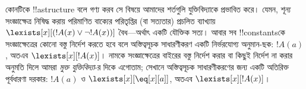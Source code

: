 \documentclass[../../../include/open-logic-section]{subfiles}
\begin{document}
\begin{digress}
কোনটিকে !!a{structure} বলে গণ্য করব সে বিষয়ে আমাদের শর্তগুলি
যুক্তিবিদ্যাকে প্রভাবিত করে। যেমন, শূন্য সংজ্ঞাক্ষেত্র নিষিদ্ধ করায়
পরিমাণিত বাক্যের পরিতৃপ্তির (বা সত্যতার) প্রচলিত ব্যাখ্যায়
$\lexists[x][(!A(x) \lor \lnot !A(x))]$ বৈধ—অর্থাৎ একটি যৌক্তিক সত্য।
আবার সব !!{constant}sকে সংজ্ঞাক্ষেত্রের কোনো বস্তু নির্দেশ করতে হবে
বলে অস্তিত্বসূচক সাধারণীকরণ একটি নির্ভরযোগ্য অনুমান-ছক: $!A(a)$,
অতএব $\lexists[x][!A(x)]$। নামকে সংজ্ঞাক্ষেত্রের বাইরের বস্তু নির্দেশ
করার বা কিছুই নির্দেশ না করার অনুমতি দিলে আমরা \emph{মুক্ত
যুক্তিবিদ্যা}-র দিকে এগোতাম; সেখানে অস্তিত্বসূচক সাধারণীকরণের জন্য একটি
অতিরিক্ত পূর্বধারণা দরকার: $!A(a)$ ও $\lexists[x][\eq[x][a]]$,
অতএব $\lexists[x][!A(x)]$।
\end{digress}
\end{document}
